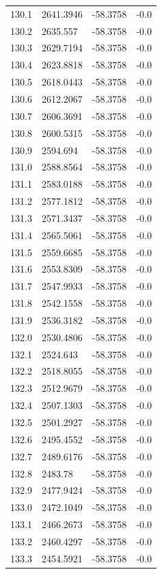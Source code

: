 \begin{table}[H]
\begin{tabular}{llll}
130.1 & 2641.3946 & -58.3758 & -0.0 \\
130.2 & 2635.557 & -58.3758 & -0.0 \\
130.3 & 2629.7194 & -58.3758 & -0.0 \\
130.4 & 2623.8818 & -58.3758 & -0.0 \\
130.5 & 2618.0443 & -58.3758 & -0.0 \\
130.6 & 2612.2067 & -58.3758 & -0.0 \\
130.7 & 2606.3691 & -58.3758 & -0.0 \\
130.8 & 2600.5315 & -58.3758 & -0.0 \\
130.9 & 2594.694 & -58.3758 & -0.0 \\
131.0 & 2588.8564 & -58.3758 & -0.0 \\
131.1 & 2583.0188 & -58.3758 & -0.0 \\
131.2 & 2577.1812 & -58.3758 & -0.0 \\
131.3 & 2571.3437 & -58.3758 & -0.0 \\
131.4 & 2565.5061 & -58.3758 & -0.0 \\
131.5 & 2559.6685 & -58.3758 & -0.0 \\
131.6 & 2553.8309 & -58.3758 & -0.0 \\
131.7 & 2547.9933 & -58.3758 & -0.0 \\
131.8 & 2542.1558 & -58.3758 & -0.0 \\
131.9 & 2536.3182 & -58.3758 & -0.0 \\
132.0 & 2530.4806 & -58.3758 & -0.0 \\
132.1 & 2524.643 & -58.3758 & -0.0 \\
132.2 & 2518.8055 & -58.3758 & -0.0 \\
132.3 & 2512.9679 & -58.3758 & -0.0 \\
132.4 & 2507.1303 & -58.3758 & -0.0 \\
132.5 & 2501.2927 & -58.3758 & -0.0 \\
132.6 & 2495.4552 & -58.3758 & -0.0 \\
132.7 & 2489.6176 & -58.3758 & -0.0 \\
132.8 & 2483.78 & -58.3758 & -0.0 \\
132.9 & 2477.9424 & -58.3758 & -0.0 \\
133.0 & 2472.1049 & -58.3758 & -0.0 \\
133.1 & 2466.2673 & -58.3758 & -0.0 \\
133.2 & 2460.4297 & -58.3758 & -0.0 \\
133.3 & 2454.5921 & -58.3758 & -0.0 \\

\end{tabular}
\end{table}
